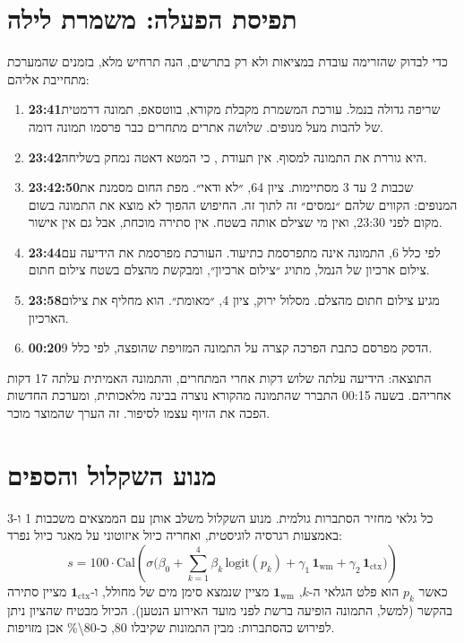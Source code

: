 \section{תפיסת הפעלה: משמרת לילה}
כדי לבדוק שהזרימה עובדת במציאות ולא רק בתרשים, הנה תרחיש מלא, בזמנים שהמערכת מתחייבת אליהם:
\begin{enumerate}
\item \textbf{\num{23:41}}\quad שריפה גדולה בנמל. עורכת המשמרת מקבלת מקורא, בווטסאפ, תמונה דרמטית של להבות מעל מנופים. שלושה אתרים מתחרים כבר פרסמו תמונה דומה.
\item \textbf{\num{23:42}}\quad היא גוררת את התמונה למסוף. אין תעודת , כי המטא דאטה נמחק בשליחה.
\item \textbf{\num{23:42:50}}\quad שכבות \num{2} עד \num{3} מסתיימות. ציון \num{64}, ״לא ודאי״. מפת החום מסמנת את המנופים: הקווים שלהם ״נמסים״ זה לתוך זה. החיפוש ההפוך לא מוצא את התמונה בשום מקום לפני \num{23:30}, ואין מי שצילם אותה בשטח. אין סתירה מוכחת, אבל גם אין אישור.
\item \textbf{\num{23:44}}\quad לפי כלל \num{6}, התמונה אינה מתפרסמת כתיעוד. העורכת מפרסמת את הידיעה עם צילום ארכיון של הנמל, מתויג ״צילום ארכיון״, ומבקשת מהצלם בשטח צילום חתום.
\item \textbf{\num{23:58}}\quad מגיע צילום חתום מהצלם. מסלול ירוק, ציון \num{4}, ״מאומת״. הוא מחליף את צילום הארכיון.
\item \textbf{\num{00:20}}\quad הדסק מפרסם כתבת הפרכה קצרה על התמונה המזויפת שהופצה, לפי כלל \num{9}.
\end{enumerate}
התוצאה: הידיעה עלתה שלוש דקות אחרי המתחרים, והתמונה האמיתית עלתה \num{17} דקות אחריהם. בשעה \num{00:15} התברר שהתמונה מהקורא נוצרה בבינה מלאכותית, ומערכת החדשות הפכה את הזיוף עצמו לסיפור. זה הערך שהמוצר מוכר.

\section{מנוע השקלול והספים}
\label{sec:fusion}
כל גלאי מחזיר הסתברות גולמית. מנוע השקלול משלב אותן עם הממצאים משכבות \num{1} ו-\num{3} באמצעות רגרסיה לוגיסטית, ואחריה כיול איזוטוני על מאגר כיול נפרד:
\begin{equation*}
s = 100\cdot \mathrm{Cal}\!\left(\sigma\Big(\beta_0+\sum_{k=1}^{4}\beta_k\,\mathrm{logit}(p_k)+\gamma_1\,\mathbf{1}_{\text{wm}}+\gamma_2\,\mathbf{1}_{\text{ctx}}\Big)\right)
\end{equation*}
כאשר $p_k$ הוא פלט הגלאי ה-$k$, $\mathbf{1}_{\text{wm}}$ מציין שנמצא סימן מים של מחולל, ו-$\mathbf{1}_{\text{ctx}}$ מציין סתירה בהקשר (למשל, התמונה הופיעה ברשת לפני מועד האירוע הנטען). הכיול מבטיח שהציון ניתן לפירוש כהסתברות: מבין התמונות שקיבלו \num{80}, כ-\num{80\%} אכן מזויפות.

